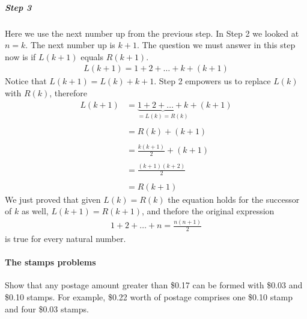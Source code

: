 \documentclass[letterpaper,10pt,english]{sphinxmanual}
\begin{document}
\subparagraph{Step 3}
\label{\detokenize{COMP163/notes/induction:id3}}
Here we use the next number up from the previous step. In Step 2 we looked at \(n=k\). The next number up is \(k+1\). The question we must answer in this step now is if \(L(k+1)\) equals \(R(k+1)\).
\begin{equation*}
\begin{split}L(k+1) = 1+2+\ldots +k + (k+1)\end{split}
\end{equation*}
Notice that \(L(k+1)=L(k)+k+1\). Step 2 empowers us to replace \(L(k)\) with \(R(k)\), therefore
\begin{equation*}
\begin{split}L(k+1) &= \underbrace{1+2+\ldots +k}_{=L(k)=R(k)} + (k+1) \\ \\
       &= R(k)+(k+1) \\ \\
               &= \frac{k(k+1)}{2} + (k+1)\\ \\
               &= \frac{(k+1)(k+2)}{2} \\ \\
               &= R(k+1)\end{split}
\end{equation*}
We just proved that given  \(L(k)=R(k)\) the equation holds for the successor of \(k\) as well, \(L(k+1)=R(k+1)\), and thefore the original expression
\begin{equation*}
\begin{split}1+2+\ldots + n = \frac{n(n+1)}{2}\end{split}
\end{equation*}
is true for every natural number.


\paragraph{The stamps problems}
\label{\detokenize{COMP163/notes/induction:the-stamps-problems}}
Show that any postage amount greater than \$0.17 can be formed with \$0.03 and \$0.10 stamps. For example, \$0.22 worth of postage comprises one \$0.10 stamp and four \$0.03 stamps.
\end{document}
